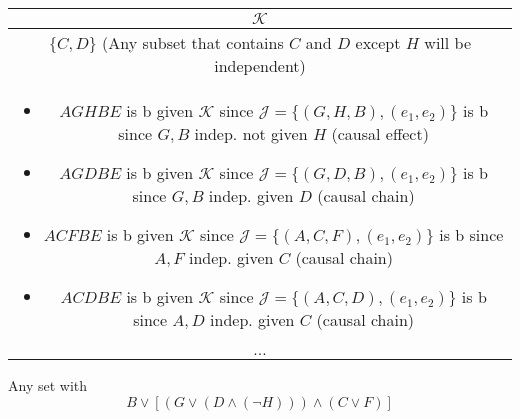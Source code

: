 \begin{example}
    \begin{center}
        \begin{tabular}{c}
            \toprule
            $\mathcal{K}$ \\
            \midrule
            $\{C,D\}$ (Any subset that contains $C$ and $D$ except $H$ will be independent) \\
            \multicolumn{1}{p{\linewidth}}{
                \begin{itemize}
                    \item $AGHBE$ is b given $\mathcal{K}$ since $\mathcal{J} = \{(G,H,B),(e_1,e_2)\}$ is b since $G,B$ indep. not given $H$ (causal effect)
                    \item $AGDBE$ is b given $\mathcal{K}$ since $\mathcal{J} = \{(G,D,B),(e_1,e_2)\}$ is b since $G,B$ indep. given $D$ (causal chain)
                    \item $ACFBE$ is b given $\mathcal{K}$ since $\mathcal{J} = \{(A,C,F),(e_1,e_2)\}$ is b since $A,F$ indep. given $C$ (causal chain)
                    \item $ACDBE$ is b given $\mathcal{K}$ since $\mathcal{J} = \{(A,C,D),(e_1,e_2)\}$ is b since $A,D$ indep. given $C$ (causal chain)
                \end{itemize}} \\
            \midrule
            $\ldots$ \\
            \toprule
        \end{tabular}
    \end{center}
\end{example}

\begin{example}
    Any set with 
    \begin{equation*}
        B \lor [(G \lor (D \land (\lnot H))) \land (C \lor F)]
    \end{equation*}
\end{example}
\newpage


